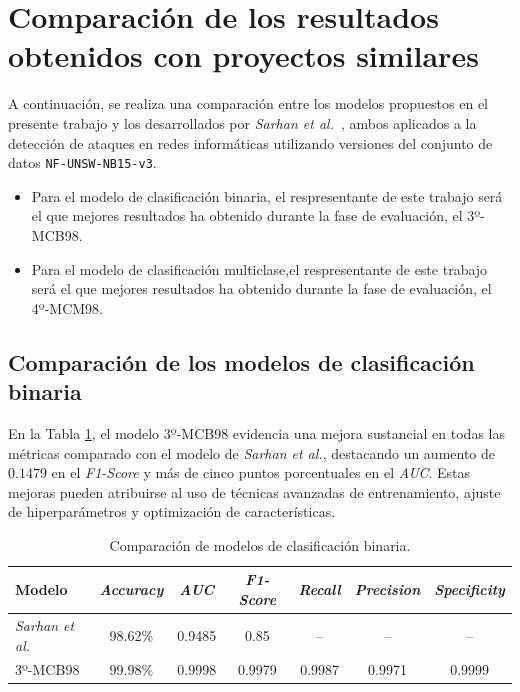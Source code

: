 \section{Comparación de los resultados obtenidos con proyectos similares}

A continuación, se realiza una comparación entre los modelos propuestos en el presente trabajo y los desarrollados por \textit{Sarhan et al.}~\cite{sarhan2020netflow}, ambos aplicados a la detección de ataques en redes informáticas utilizando versiones del conjunto de datos \texttt{NF-UNSW-NB15-v3}.

\begin{itemize}
	\item Para el modelo de clasificación binaria, el respresentante de este trabajo será el que mejores resultados ha obtenido durante la fase de evaluación, el 3º-MCB98.
	\item Para el modelo de clasificación multiclase,el respresentante de este trabajo será el que mejores resultados ha obtenido durante la fase de evaluación, el 4º-MCM98. 
\end{itemize}


\subsection{Comparación de los modelos de clasificación binaria}

En la Tabla \ref{tab:compbin}, el modelo 3º-MCB98 evidencia una mejora sustancial en todas las métricas comparado con el modelo de \textit{Sarhan et al.}, destacando un aumento de $0.1479$ en el \textit{F1-Score} y más de cinco puntos porcentuales en el \textit{AUC}. Estas mejoras pueden atribuirse al uso de técnicas avanzadas de entrenamiento, ajuste de hiperparámetros y optimización de características.

\begin{table}[H]
\centering
\begin{tabular}{|l|c|c|c|c|c|c|}
\hline
\textbf{Modelo} & \textbf{\textit{Accuracy}} & \textbf{\textit{AUC}} & \textbf{\textit{F1-Score}} & \textbf{\textit{Recall}} & \textbf{\textit{Precision}} & \textbf{\textit{Specificity}} \\
\hline
\textit{Sarhan et al.} & 98.62\% & 0.9485 & 0.85 & -- & -- & -- \\
3º-MCB98 & 99.98\% & 0.9998 & 0.9979 & 0.9987 & 0.9971 & 0.9999 \\
\hline
\end{tabular}
\caption{Comparación de modelos de clasificación binaria.}
\label{tab:compbin}
\end{table}

